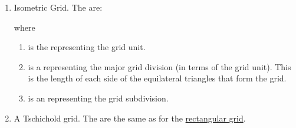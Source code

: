 \begin{numbered}
\begin{enumerate}
\begin{enumerate}
     \item Isometric Grid. The  are:
    \begin{syntaxline}
      
    \end{syntaxline}
    where
      \begin{enumerate}
       \item {} is the  representing the grid unit.

       \item {} is a  representing the major
        grid division (in terms of the grid unit). This is the
length of each side of the equilateral triangles that form the grid.

       \item {} is an  representing the grid subdivision.
      \end{enumerate}
 
    \item A Tschichold grid. The
      are the same as for the 
     \hyperref[jdr:rectgrid]{rectangular grid}.


\end{enumerate}
\end{enumerate}
\end{numbered}
